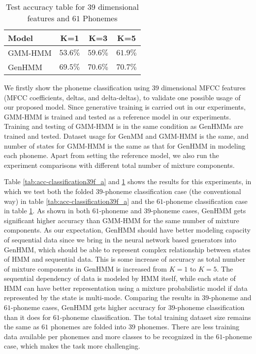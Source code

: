 \documentclass{ecai}
\begin{document}
\begin{table}
  \caption{Test accuracy table for $39$ dimensional features and $61$ Phonemes}\label{tab:acc-classification39f_b}
  \centering  
  \begin{tabular}{l|c|c|c} \toprule
    {Model} &  K=1 &  K=3 &  K=5
    \\ \midrule
    GMM-HMM & $53.6\%$ &  $59.6\%$ & $61.9\%$  \\ \midrule
    GenHMM & $69.5\%$ & $70.6\%$ & $70.7\%$   \\ 
    \bottomrule
  \end{tabular}
  \vspace{0.2cm}
\end{table}
We firstly show the phoneme classification using 39 dimensional MFCC features (MFCC coefficients, deltas, and delta-deltas), to validate one possible usage of our proposed model. Since generative training is carried out in our experiments, GMM-HMM is trained and tested as a reference model in our experiments. Training and testing of GMM-HMM is in the same condition as GenHMMs are trained and tested. Dataset usage for GenMM and GMM-HMM is the same, and number of states for GMM-HMM is the same as that for GenHMM in modeling each phoneme. Apart from setting the reference model, we also run the experiment comparisons with different total number of mixture components.

Table \ref{tab:acc-classification39f_a} and \ref{tab:acc-classification39f_b} shows the results for this experiments, in which we test both the folded $39$-phoneme classification case (the conventional way) in table \ref{tab:acc-classification39f_a} and the $61$-phoneme classification case in table \ref{tab:acc-classification39f_b}. As shown in both $61$-phoneme and $39$-phoneme cases, GenHMM gets significant higher accuracy than GMM-HMM for the same number of mixture components. As our expectation, GenHMM should have better modeling capacity of sequential data since we bring in the neural network based generators into GenHMM, which should be able to represent complex relationship between states of HMM and sequential data. This is some increase of accuracy as total number of mixture components in GenHMM is increased from $K=1$ to $K=5$. The sequential dependency of data is modeled by HMM itself, while each state of HMM can have better representation using a mixture probabilistic model if data represented by the state is multi-mode. Comparing the results in $39$-phoneme and $61$-phoneme cases, GenHMM gets higher accuracy for $39$-phoneme classification than it does for $61$-phoneme classification. The total training dataset size remains the same as $61$ phonemes are folded into $39$ phonemes. There are less training data available per phonemes and more classes to be recognized in the $61$-phoneme case, which makes the task more challenging.
\end{document}
